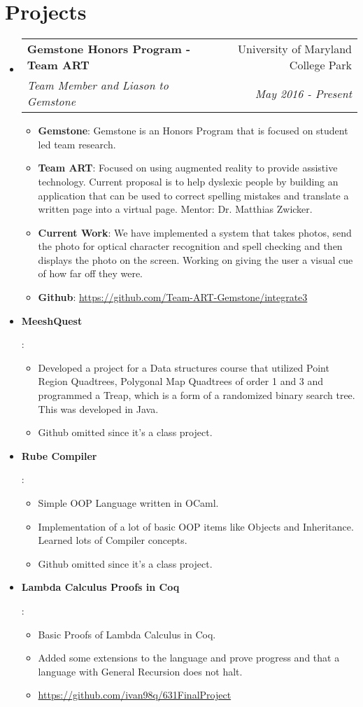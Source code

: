 \documentclass[letterpaper,10.95pt]{article}
\makeatletter
\newcommand{\resumeItem}[2]{
  \item\small{
    \textbf{#1}{: #2 \vspace{-2pt}}
  }
}
\newcommand{\resumeSubheading}[4]{
  \vspace{-1pt}\item
    \begin{tabular*}{0.97\textwidth}{l@{\extracolsep{\fill}}r}
      \textbf{#1} & #2 \\
      \textit{\small#3} & \textit{\small #4} \\
    \end{tabular*}\vspace{-5pt}
}
\newcommand{\resumeSubItem}[2]{\resumeItem{#1}{#2}\vspace{-4pt}}
\newcommand{\resumeSubHeadingListStart}{\begin{itemize}[leftmargin=*]}
\newcommand{\resumeSubHeadingListEnd}{\end{itemize}}
\newcommand{\resumeItemListStart}{\begin{itemize}}
\newcommand{\resumeItemListEnd}{\end{itemize}\vspace{-5pt}}
\makeatother
\begin{document}
\section{Projects}
  \resumeSubHeadingListStart
    \resumeSubheading{Gemstone Honors Program - Team ART}{University of Maryland College Park}
	{Team Member and Liason to Gemstone}{May 2016 - Present}
      \resumeItemListStart
		\resumeItem{Gemstone}{Gemstone is an Honors Program that is focused on student led team research.}
		\resumeItem{Team ART}{Focused on using augmented reality to provide assistive technology. Current proposal is to help dyslexic people by building an application that can be used to correct spelling mistakes and translate a written page into a virtual page. Mentor: Dr. Matthias Zwicker.}
		\resumeItem {Current Work}{We have implemented a system that takes photos, send the photo for optical character recognition and spell checking and then displays the photo on the screen. Working on giving the user a visual cue of how far off they were.}
		\resumeItem{Github}{\href{https://github.com/Team-ART-Gemstone/integrate3}{https://github.com/Team-ART-Gemstone/integrate3}}
	\resumeItemListEnd
    \resumeSubItem{MeeshQuest} {\begin{itemize}
	\item Developed a project for a Data structures course that utilized Point Region Quadtrees, Polygonal Map Quadtrees of order 1 and 3 and programmed a Treap, which is a form of a randomized binary search tree. This was developed in Java.
	\item Github omitted since it's a class project.\end{itemize}}
    \resumeSubItem{Rube Compiler}{\begin{itemize} \item Simple OOP Language written in OCaml. \item Implementation of a lot of basic OOP items like Objects and Inheritance. Learned lots of Compiler concepts.
\item Github omitted since it's a class project. \end{itemize}}
	
      \resumeSubItem{Lambda Calculus Proofs in Coq}{\begin{itemize}\item Basic Proofs of Lambda Calculus in Coq. \item Added some extensions to the language and prove progress and that a language with General Recursion does not halt. \item \href{https://github.com/ivan98q/631FinalProject}{https://github.com/ivan98q/631FinalProject} \end{itemize}}
  \resumeSubHeadingListEnd
\end{document}
